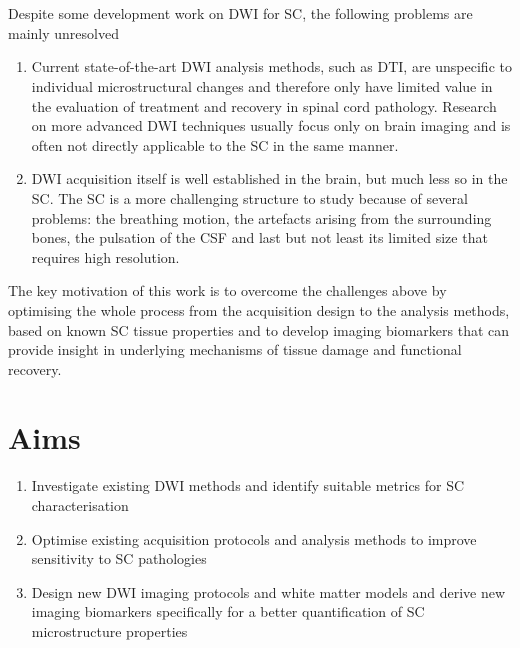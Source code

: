 

\section{}
Despite some development work on \gls{DWI} for \gls{SC}, the following problems are mainly unresolved 
\begin{enumerate}
\item Current state-of-the-art \gls{DWI} analysis methods, such as \gls{DTI}, are unspecific to individual microstructural changes and therefore only have limited value in the evaluation of treatment and recovery in spinal cord pathology. Research on more advanced \gls{DWI} techniques usually focus only on brain imaging and is often not directly applicable to the \gls{SC} in the same manner.
\item \gls{DWI} acquisition itself is well established in the brain, but much less so in the \gls{SC}. The \gls{SC} is a more challenging structure to study because of several problems: the breathing motion, the artefacts arising from the surrounding bones, the pulsation of the {\gls{CSF}} and last but not least its limited size that requires high resolution.  
\end{enumerate} 
The key motivation of this work is to overcome the challenges above by optimising the whole process from the acquisition design to the analysis methods, based on known \gls{SC} tissue properties and to develop imaging biomarkers that can provide insight in underlying mechanisms of tissue damage and functional recovery.

\section{Aims}
\begin{enumerate}
  \item Investigate existing \gls{DWI} methods and identify suitable metrics for \gls{SC} characterisation
  \item Optimise existing acquisition protocols and analysis methods to improve sensitivity to \gls{SC} pathologies
  \item Design new \gls{DWI} imaging protocols and white matter models and derive new imaging biomarkers specifically for a better quantification of \gls{SC} microstructure properties
\end{enumerate}

